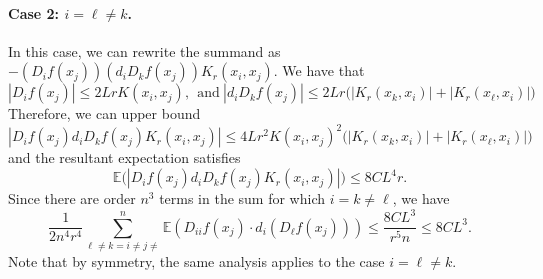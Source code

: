 \documentclass{article}
\newcommand{\abs}[1]{\left \lvert #1 \right \rvert}
\newcommand{\1}{\mathbf{1}}
\newcommand{\Ebb}{\mathbb{E}}
\theoremstyle{alden}
\theoremstyle{aldenthm}
\theoremstyle{definition}
\theoremstyle{remark}
\begin{document}
\paragraph{Case 2: $i = \ell \neq k$.}
In this case, we can rewrite the summand as $-(D_if(x_j))(d_iD_kf(x_j))K_r(x_i,x_j)$. We have that
\begin{equation*}
\abs{D_if(x_j)} \leq 2LrK(x_i,x_j),~~\textrm{and}~ \abs{d_iD_kf(x_j)} \leq 2Lr \bigl(\abs{K_r(x_k,x_i)} + \abs{K_r(x_{\ell},x_i)}\bigr)
\end{equation*}
Therefore, we can upper bound
\begin{equation*}
\abs{D_if(x_j)d_iD_kf(x_j)K_r(x_i,x_j)} \leq 4Lr^2K(x_i,x_j)^2\bigl(\abs{K_r(x_k,x_i)} + \abs{K_r(x_{\ell},x_i)}\bigr)
\end{equation*}
and the resultant expectation satisfies
\begin{equation*}
\Ebb\bigl(\abs{D_if(x_j)d_iD_kf(x_j)K_r(x_i,x_j)}\bigr) \leq 8CL^4r.
\end{equation*}
Since there are order $n^3$ terms in the sum for which $i = k \neq \ell$, we have
\begin{equation*}
\frac{1}{2n^4r^4}\sum_{\ell\neq k = i \neq j\neq }^{n} \Ebb(D_{ii}f(x_j) \cdot d_i(D_{\ell}f(x_j))) \leq \frac{8 C L^3}{r^5n} \leq 8 C L^3.
\end{equation*}
Note that by symmetry, the same analysis applies to the case $i = \ell \neq k$.
\end{document}
